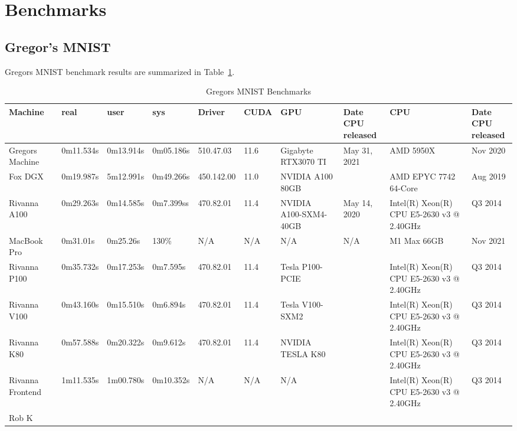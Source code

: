 \documentclass[sigplan,screen]{acmart}
\begin{document}

\section{Benchmarks}


\subsection{Gregor's MNIST}

Gregors MNIST benchmark results are summarized in Table~\ref{tab:mnist}.

\begin{table}[!ht]
\caption{Gregors MNIST Benchmarks}\label{tab:mnist}
    \centering
      \begin{adjustbox}{max width=\textwidth}
    \begin{tabular}{|l|l|l|l|l|l|l|l|l|l|}
    \hline
        Machine & real & user & sys & Driver & CUDA & GPU & \makecell{Date CPU \\released} & CPU & \makecell{Date CPU \\released} \\ \hline
        Gregors Machine & 0m11.534s & 0m13.914s & 0m05.186s & 510.47.03 & 11.6 & Gigabyte RTX3070 TI & May 31, 2021 & AMD 5950X & Nov 2020 \\ \hline
        Fox DGX & 0m19.987s & 5m12.991s & 0m49.266s & 450.142.00 & 11.0 & NVIDIA A100 80GB & & AMD EPYC 7742 64-Core & Aug 2019 \\ \hline
        Rivanna A100 & 0m29.263s & 0m14.585s & 0m7.399ss & 470.82.01 & 11.4 & NVIDIA A100-SXM4-40GB & May 14, 2020 & Intel(R) Xeon(R) CPU E5-2630 v3 @ 2.40GHz & Q3  2014 \\ \hline
        MacBook Pro & 0m31.01s & 0m25.26s & 130\% & N/A & N/A & N/A & N/A & M1 Max 66GB & Nov 2021 \\ \hline
        Rivanna P100 & 0m35.732s & 0m17.253s & 0m7.595s & 470.82.01 & 11.4 & Tesla P100-PCIE & & Intel(R) Xeon(R) CPU E5-2630 v3 @ 2.40GHz & Q3  2014 \\ \hline
        Rivanna V100 & 0m43.160s & 0m15.510s & 0m6.894s & 470.82.01 & 11.4 & Tesla V100-SXM2 & & Intel(R) Xeon(R) CPU E5-2630 v3 @ 2.40GHz & Q3  2014 \\ \hline
        Rivanna K80 & 0m57.588s & 0m20.322s & 0m9.612s & 470.82.01 & 11.4 & NVIDIA TESLA K80 & & Intel(R) Xeon(R) CPU E5-2630 v3 @ 2.40GHz & Q3  2014 \\ \hline
        Rivanna Frontend & 1m11.535s & 1m00.780s & 0m10.352s & N/A & N/A & N/A & & Intel(R) Xeon(R) CPU E5-2630 v3 @ 2.40GHz & Q3  2014 \\ \hline
        Rob K & 
    \end{tabular}
    \end{adjustbox}
\end{table}
\end{document}
